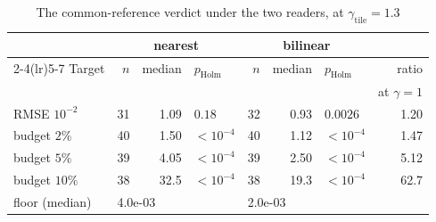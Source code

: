 \begin{table}[t]
\centering
\caption{The common-reference verdict under the two readers, at $\gamma_{\mathrm{tile}}=1.3$}
\label{tab:common_two_readers}
\scriptsize
\setlength{\tabcolsep}{4pt}
\begin{tabular}{@{}lrrlrrlr@{}}
\toprule
 & \multicolumn{3}{c}{nearest} & \multicolumn{3}{c}{bilinear} & \\
\cmidrule(lr){2-4}\cmidrule(lr){5-7}
Target & $n$ & median & $p_{\mathrm{Holm}}$ & $n$ & median & $p_{\mathrm{Holm}}$ & ratio \\
 & & \multicolumn{2}{c}{} & & \multicolumn{2}{c}{} & at $\gamma{=}1$ \\
\midrule
RMSE $10^{-2}$ & 31 & 1.09 & $0.18$ & 32 & 0.93 & $0.0026$ & 1.20 \\
budget $2\%$ & 40 & 1.50 & $<10^{-4}$ & 40 & 1.12 & $<10^{-4}$ & 1.47 \\
budget $5\%$ & 39 & 4.05 & $<10^{-4}$ & 39 & 2.50 & $<10^{-4}$ & 5.12 \\
budget $10\%$ & 38 & 32.5 & $<10^{-4}$ & 38 & 19.3 & $<10^{-4}$ & 62.7 \\
\midrule
floor (median) & \multicolumn{3}{l}{4.0e-03} & \multicolumn{3}{l}{2.0e-03} & \\
\bottomrule
\end{tabular}
\end{table}

